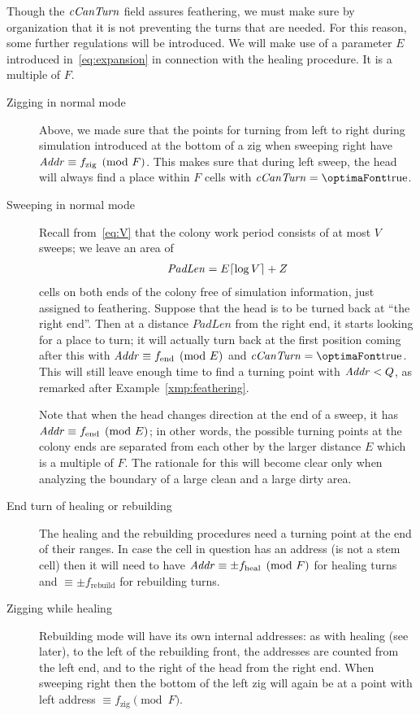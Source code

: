 \documentclass[12pt]{memoir}
\newcommand{\fld}[1]{\ensuremath{\textit{#1\/}}}
\newcommand{\tEnd}{f_{\mathrm{end}}}
\newcommand{\tZig}{f_{\mathrm{zig}}}
\newcommand{\tHeal}{f_{\mathrm{heal}}}
\newcommand{\tRebuild}{f_{\mathrm{rebuild}}}
\newcommand{\E}{E}
\renewcommand{\V}{V}
\newcommand{\F}{F}
\newcommand{\Z}{Z}
\newcommand{\Addr}{\fld{Addr}}
\newcommand{\cCanTurn}{\fld{cCanTurn}}
\newcommand{\PadLen}{\mathit{PadLen}}
\begin{document}
Though the \( \cCanTurn \) field assures feathering, we must make sure by organization
that it is not preventing the turns that are needed.
For this reason, some further regulations will be introduced.
We will make use of a parameter \( \E \) introduced in~\eqref{eq:expansion} 
in connection with the healing procedure.
It is a multiple of \( \F \).
\begin{description}
  \item[Zigging in normal mode]
Above, we made sure that the points for turning from left to right during simulation
introduced at the bottom of a zig when sweeping right have \( \Addr\equiv \tZig\pmod{\F} \).
This makes sure that during left sweep, the head will always find a place within \( \F \) cells
with \( \cCanTurn=\true \).

  \item[Sweeping in normal mode]
Recall from~\eqref{eq:V} that the colony work period consists of at most \( \V \) sweeps;
we leave an area of
\begin{align}\label{eq:PadLenDef}
 \PadLen = \E\cei{\log\V}+\Z %
 \end{align} cells on both ends of the colony free of simulation information,
just assigned to feathering.
Suppose that the head is to be turned back at ``the right end''.
Then at a distance \( \PadLen \) from the right end, 
it starts looking for a place to turn;
it will actually turn back at the first position coming after this
with \( \Addr\equiv \tEnd \pmod{\E} \) and \( \cCanTurn=\true \).
This will still leave enough time to find a turning point with \( \Addr<Q \), 
as remarked after Example~\ref{xmp:feathering}.

Note that when the head changes direction at the end of a sweep,
it has \( \Addr\equiv \tEnd\pmod{\E} \); in other words, the
possible turning points at the colony ends are separated from each other by the
larger distance \( \E \) which is a multiple of \( \F \). 
The rationale for this will become clear only when analyzing the boundary of a large
clean and a large dirty area.

\item[End turn of healing or rebuilding]
The healing and the rebuilding procedures need a turning point
at the end of their ranges.
In case the cell in question has an address (is not a stem cell) then
it will need to have \( \Addr\equiv \pm\tHeal\pmod{\F} \) 
for healing turns and \( \equiv \pm\tRebuild \) for rebuilding turns.

\item[Zigging while healing]
Rebuilding mode will have its own internal addresses: as with healing (see later),
to the left of the rebuilding front, the addresses are counted from the left end, and to the right
of the head from the right end.
When sweeping right then the bottom of the left zig will again be at a 
point with left address \( \equiv\tZig\pmod{\F} \).


\end{description}
\end{document}
